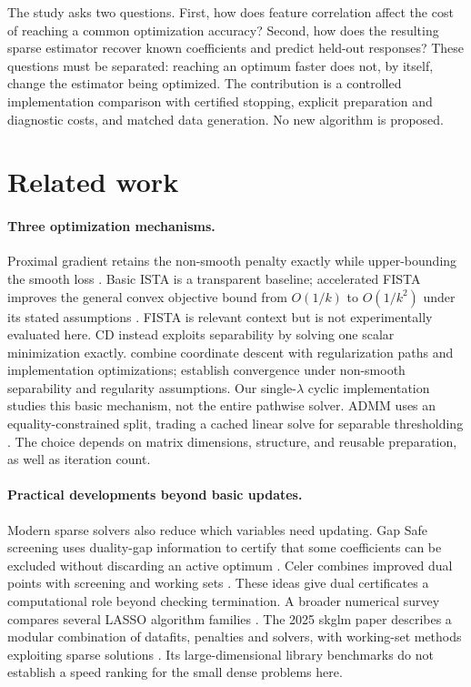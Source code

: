 \documentclass{article}
\begin{document}
The study asks two questions. First, how does feature correlation affect the cost of reaching a common optimization accuracy? Second, how does the resulting sparse estimator recover known coefficients and predict held-out responses? These questions must be separated: reaching an optimum faster does not, by itself, change the estimator being optimized. The contribution is a controlled implementation comparison with certified stopping, explicit preparation and diagnostic costs, and matched data generation. No new algorithm is proposed.

\section{Related work}
\paragraph{Three optimization mechanisms.} Proximal gradient retains the non-smooth penalty exactly while upper-bounding the smooth loss \citep{parikh2014}. Basic ISTA is a transparent baseline; accelerated FISTA improves the general convex objective bound from $O(1/k)$ to $O(1/k^2)$ under its stated assumptions \citep{beck2009}. FISTA is relevant context but is not experimentally evaluated here. CD instead exploits separability by solving one scalar minimization exactly. \citet{friedman2010} combine coordinate descent with regularization paths and implementation optimizations; \citet{tseng2001} establish convergence under non-smooth separability and regularity assumptions. Our single-$\lambda$ cyclic implementation studies this basic mechanism, not the entire pathwise solver. ADMM uses an equality-constrained split, trading a cached linear solve for separable thresholding \citep{boyd2011}. The choice depends on matrix dimensions, structure, and reusable preparation, as well as iteration count.

\paragraph{Practical developments beyond basic updates.} Modern sparse solvers also reduce which variables need updating. Gap Safe screening uses duality-gap information to certify that some coefficients can be excluded without discarding an active optimum \citep{ndiaye2017}. Celer combines improved dual points with screening and working sets \citep{massias2018}. These ideas give dual certificates a computational role beyond checking termination. A broader numerical survey compares several LASSO algorithm families \citep{zhao2023}. The 2025 skglm paper describes a modular combination of datafits, penalties and solvers, with working-set methods exploiting sparse solutions \citep{moufad2025}. Its large-dimensional library benchmarks do not establish a speed ranking for the small dense problems here.
\end{document}
